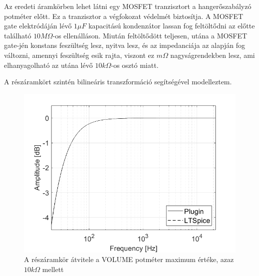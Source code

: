 Az eredeti áramkörben lehet látni egy MOSFET tranzisztort a hangerőszabályzó potméter előtt. Ez a tranzisztor a végfokozat védelmét biztosítja. A MOSFET gate elektródáján lévő $1\mu F$ kapacitású kondenzátor lassan fog feltöltődni az előtte található $10M\Omega$-os ellenálláson. Miután feltöltődött teljesen, utána a MOSFET gate-jén konstans feszültség lesz, nyitva lesz, és az impedanciája az alapján fog változni, amennyi feszültség esik rajta, viszont ez $m\Omega$ nagyságrendekben lesz, ami elhanyagolható az utána lévő $10k\Omega$-os osztó miatt.

A részáramkört szintén bilineáris transzformáció segítségével modelleztem.

\begin{figure}[H]
    \centering
    \includegraphics[scale=0.5]{figures/stage7ac3.png}
    \caption{A részáramkör átvitele a VOLUME potméter maximum értéke, azaz $10k\Omega$ mellett}
\end{figure}


